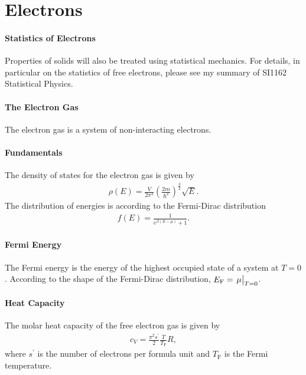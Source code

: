 \section{Electrons}

\paragraph{Statistics of Electrons}
Properties of solids will also be treated using statistical mechanics. For details, in particular on the statistics of free electrons, please see my summary of SI1162 Statistical Physics.

\paragraph{The Electron Gas}
The electron gas is a system of non-interacting electrons.

\paragraph{Fundamentals}
The density of states for the electron gas is given by
\begin{align*}
	\rho(E) = \frac{V}{2\pi^{2}}\left(\frac{2m}{\hbar^{2}}\right)^{\frac{3}{2}}\sqrt{E}.
\end{align*}
The distribution of energies is according to the Fermi-Dirac distribution
\begin{align*}
	f(E) = \frac{1}{e^{\beta(E - \mu)} + 1}.
\end{align*}

\paragraph{Fermi Energy}
The Fermi energy is the energy of the highest occupied state of a system at $T = 0$. According to the shape of the Fermi-Dirac distribution, $E_{\text{F}} = \eval{\mu}_{T = 0}$.

\paragraph{Heat Capacity}
The molar heat capacity of the free electron gas is given by
\begin{align*}
	c_{V} = \frac{\pi^{2}s^{\prime}}{2}\frac{T}{T_{\text{F}}}R,
\end{align*}
where $s^{\prime}$ is the number of electrons per formula unit and $T_{\text{F}}$ is the Fermi temperature.
	
